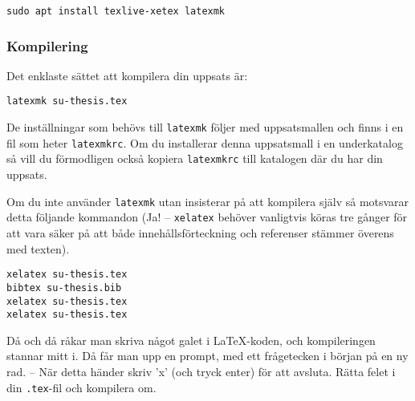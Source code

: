 \begin{verbatim}
sudo apt install texlive-xetex latexmk
\end{verbatim}



\subsubsection{Kompilering}

Det enklaste sättet att kompilera din uppsats är:

\begin{verbatim}
latexmk su-thesis.tex
\end{verbatim}

De inställningar som behövs till \texttt{latexmk} följer med uppsatsmallen och
finns i en fil som heter \texttt{latexmkrc}. Om du installerar denna
uppsatsmall i en underkatalog så vill du förmodligen också kopiera
\texttt{latexmkrc} till katalogen där du har din uppsats.

Om du inte använder \texttt{latexmk} utan insisterar på att kompilera
själv så motsvarar detta följande kommandon (Ja! -- \texttt{xelatex} behöver
vanligtvis köras tre gånger för att vara säker på att både innehållsförteckning
och referenser stämmer överens med texten).

\begin{verbatim}
xelatex su-thesis.tex
bibtex su-thesis.bib
xelatex su-thesis.tex
xelatex su-thesis.tex
\end{verbatim}

\noindent Då och då råkar man skriva något galet i \LaTeX{}-koden, och
kompileringen stannar mitt i. Då får man upp en prompt, med ett frågetecken i
början på en ny rad. -- När detta händer skriv 'x' (och tryck enter) för att
avsluta. Rätta felet i din \texttt{.tex}-fil och kompilera om.

